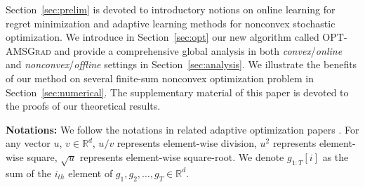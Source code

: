 \documentclass[11pt]{article}
\theoremstyle{k}
\begin{document}
Section~\ref{sec:prelim} is devoted to introductory notions on online learning for regret minimization and adaptive learning methods for nonconvex stochastic optimization. We introduce in Section~\ref{sec:opt} our new algorithm called \textsc{OPT-AMSGrad} and provide a comprehensive global analysis in both \emph{convex}/\emph{online}  and \emph{nonconvex}/\emph{offline} settings in Section~\ref{sec:analysis}.
We illustrate the benefits of our method on several finite-sum nonconvex optimization problem in Section~\ref{sec:numerical}.
The supplementary material of this paper is devoted to the proofs of our theoretical results.

\textbf{Notations:} We follow the notations in related adaptive optimization papers \citep{KB15,RKK18}. For any vector $u$, $v \in \mathbb R^{d}$,  $u/v$ represents element-wise division,
$u^{2}$ represents element-wise square, $\sqrt{u}$ represents element-wise square-root.
We denote $g_{1:T}[i]$ as the sum of the $i_{th}$ element of $g_{1}, g_{2},
\dots, g_{T} \in \mathbb R^{d}$.
\end{document}
